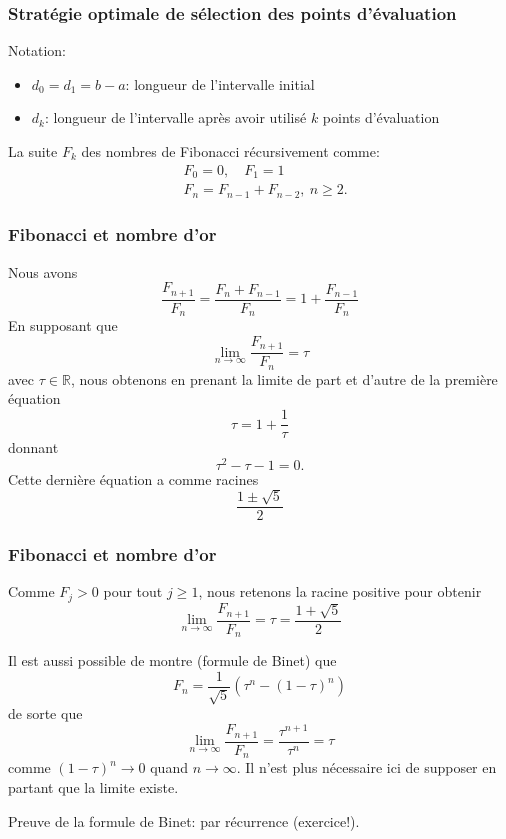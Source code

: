 \documentclass[usepdftitle=false]{beamer}
\def\RR{\mathbb{R}}
\begin{document}
\begin{frame}
\frametitle{Stratégie optimale de sélection des points d’évaluation}

Notation:
\begin{itemize}
\item
$d_0 = d_1 = b - a$: longueur de l'intervalle initial
\item
$d_k$: longueur de l'intervalle après avoir utilisé $k$ points d'évaluation
\end{itemize}

\mbox{}

La suite $F_k$ des nombres de Fibonacci récursivement comme:
\begin{align*}
& F_0 = 0, \quad F_1 = 1 \\
& F_n = F_{n-1} + F_{n-2},\ n \geq 2.
\end{align*}

\end{frame}

\begin{frame}
\frametitle{Fibonacci et nombre d'or}

Nous avons
$$
\frac{F_{n+1}}{F_n} = \frac{F_n+F_{n-1}}{F_n} = 1 + \frac{F_{n-1}}{F_n}
$$
En supposant que
$$
\lim_{n \rightarrow \infty} \frac{F_{n+1}}{F_n} = \tau
$$
avec $\tau \in \RR$, nous obtenons en prenant la limite de part et d'autre de la première équation
$$
\tau = 1 + \frac{1}{\tau}
$$
donnant
$$
\tau^2 - \tau - 1 = 0.
$$
Cette dernière équation a comme racines
$$
\frac{1 \pm \sqrt{5}}{2}
$$
\end{frame}

\begin{frame}
\frametitle{Fibonacci et nombre d'or}

Comme $F_j > 0$ pour tout $j \geq 1$, nous retenons la racine positive pour obtenir
$$
\lim_{n \rightarrow \infty} \frac{F_{n+1}}{F_n} = \tau = \frac{1+\sqrt{5}}{2}
$$

\mbox{}

Il est aussi possible de montre (formule de Binet) que
$$
F_n = \frac{1}{\sqrt{5}}(\tau^n - (1-\tau)^n) 
$$
de sorte que
$$
\lim_{n \rightarrow \infty} \frac{F_{n+1}}{F_n} = \frac{\tau^{n+1}}{\tau^n} = \tau
$$
comme $(1-\tau)^n \rightarrow 0$ quand $n \rightarrow \infty$. Il n'est plus nécessaire ici de supposer en partant que la limite existe.

\mbox{}

Preuve de la formule de Binet: par récurrence (exercice!).

\end{frame}
\end{document}
